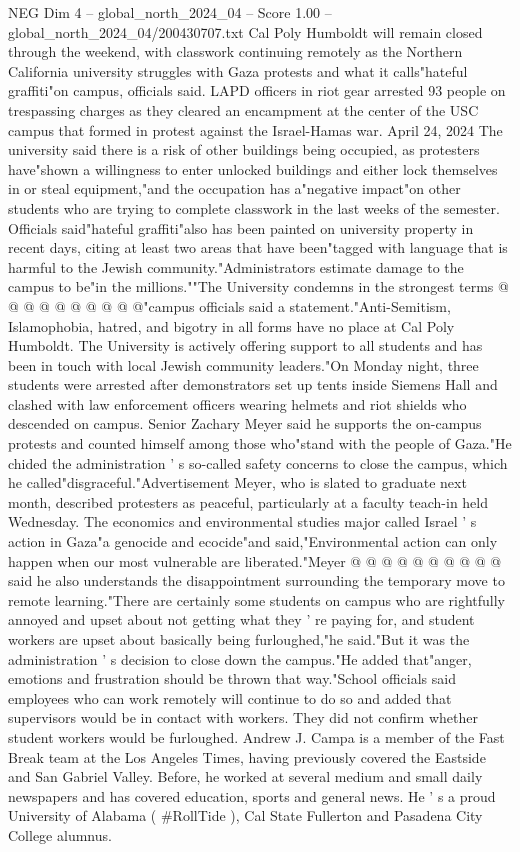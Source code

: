 \begin{textsample}{NEG Dim 4 – global\_north\_2024\_04 – Score 1.00 – global\_north\_2024\_04/200430707.txt}  \label{ex:f4_neg_099}
Cal Poly Humboldt will remain closed through the weekend, with classwork continuing remotely as the Northern California university struggles with Gaza protests and what it calls"hateful graffiti"on campus, officials said.
LAPD officers in riot gear arrested 93 people on trespassing charges as they cleared an encampment at the center of the USC campus that formed in protest against the Israel-Hamas war.
April 24, 2024 The university said there is a risk of other buildings being occupied, as protesters have"shown a willingness to enter unlocked buildings and either lock themselves in or steal equipment,"and the occupation has a"negative impact"on other students who are trying to complete classwork in the last weeks of the semester.
Officials said"hateful graffiti"also has been painted on university property in recent days, citing at least two areas that have been"tagged with language that is harmful to the Jewish community."Administrators estimate damage to the campus to be"in the millions.""The University condemns in the strongest terms @ @ @ @ @ @ @ @ @ @"campus officials said a statement."Anti-Semitism, Islamophobia, hatred, and bigotry in all forms have no place at Cal Poly Humboldt.
The University is actively offering support to all students and has been in touch with local Jewish community leaders."On Monday night, three students were arrested after demonstrators set up tents inside Siemens Hall and clashed with law enforcement officers wearing helmets and riot shields who descended on campus.
Senior Zachary Meyer said he supports the on-campus protests and counted himself among those who"stand with the people of Gaza."He chided the administration ' s so-called safety concerns to close the campus, which he called"disgraceful."Advertisement Meyer, who is slated to graduate next month, described protesters as peaceful, particularly at a faculty teach-in held Wednesday.
The economics and environmental studies major called Israel ' s action in Gaza"a genocide and ecocide"and said,"Environmental action can only happen when our most vulnerable are liberated."Meyer @ @ @ @ @ @ @ @ @ @ said he also understands the disappointment surrounding the temporary move to remote learning."There are certainly some students on campus who are rightfully annoyed and upset about not getting what they ' re paying for, and student workers are upset about basically being furloughed,"he said."But it was the administration ' s decision to close down the campus."He added that"anger, emotions and frustration should be thrown that way."School officials said employees who can work remotely will continue to do so and added that supervisors would be in contact with workers.
They did not confirm whether student workers would be furloughed.
Andrew J.
Campa is a member of the Fast Break team at the Los Angeles Times, having previously covered the Eastside and San Gabriel Valley.
Before, he worked at several medium and small daily newspapers and has covered education, sports and general news.
He ' s a proud University of Alabama ( \#RollTide ), Cal State Fullerton and Pasadena City College alumnus.

\end{textsample}
